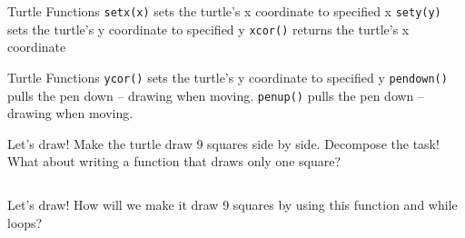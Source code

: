         \begin{frame}{Turtle Functions}
         \LARGE
            \texttt{setx(x)} \newline
            sets the turtle's x coordinate to specified x\newline\newline
            \pause
            \texttt{sety(y)} \newline
            sets the turtle's y coordinate to specified y\newline\newline
            \pause
            \texttt{xcor()}   \newline   
            returns the turtle's x coordinate\newline\newline
            \bigskip
            \end{frame}
        \begin{frame}{Turtle Functions}
        \LARGE
        \texttt{ycor()} \newline
            sets the turtle's y coordinate to specified y\newline\newline
            \pause
            \texttt{pendown()} \newline
            pulls the pen down – drawing when moving.\newline\newline
            \pause
            \texttt{penup()}\newline
            pulls the pen down – drawing when moving.\newline\newline
            
        \end{frame}
    \begin{frame}{Let's draw!}
            \large
            Make the turtle draw 9 squares side by side.
            \pause
             \newline Decompose the task! What about writing a function that draws only one square?
            \pause
            \inputminted[frame=single,framesep=2pt, lastline=10]{python3}{code-examples/draw.py}
            \pause
        \end{frame}
     \begin{frame}{Let's draw!}
            \large
            How will we make it draw 9 squares by using this function and while loops?
            \pause
            \inputminted[frame=single,framesep=2pt, firstline=12]{python3}{code-examples/draw.py}
            \pause
        \end{frame}
       
   

